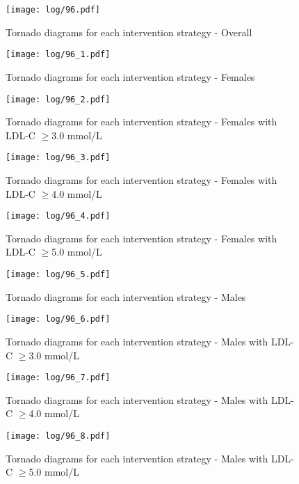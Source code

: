 \documentclass[11pt]{article}
\begin{document}
\color{Blue4}
\begin{stlog}\end{stlog}
\begin{stlog}\end{stlog}
\begin{stlog}\end{stlog}
\begin{figure}
    \centering
    \texttt{[image: log/96.pdf]}
    \caption{Tornado diagrams for each intervention strategy - Overall}
    \label{Tornado0}
\end{figure}
\begin{figure}
    \centering
    \texttt{[image: log/96\_1.pdf]}
    \caption{Tornado diagrams for each intervention strategy - Females}
    \label{Tornado00}
\end{figure}
\begin{figure}
    \centering
    \texttt{[image: log/96\_2.pdf]}
    \caption{Tornado diagrams for each intervention strategy - Females with LDL-C $\geq$3.0 mmol/L}
    \label{Tornado03}
\end{figure}
\begin{figure}
    \centering
    \texttt{[image: log/96\_3.pdf]}
    \caption{Tornado diagrams for each intervention strategy - Females with LDL-C $\geq$4.0 mmol/L}
    \label{Tornado04}
\end{figure}
\begin{figure}
    \centering
    \texttt{[image: log/96\_4.pdf]}
    \caption{Tornado diagrams for each intervention strategy - Females with LDL-C $\geq$5.0 mmol/L}
    \label{Tornado05}
\end{figure}
\begin{figure}
    \centering
    \texttt{[image: log/96\_5.pdf]}
    \caption{Tornado diagrams for each intervention strategy - Males}
    \label{Tornado10}
\end{figure}
\begin{figure}
    \centering
    \texttt{[image: log/96\_6.pdf]}
    \caption{Tornado diagrams for each intervention strategy - Males with LDL-C $\geq$3.0 mmol/L}
    \label{Tornado13}
\end{figure}
\begin{figure}
    \centering
    \texttt{[image: log/96\_7.pdf]}
    \caption{Tornado diagrams for each intervention strategy - Males with LDL-C $\geq$4.0 mmol/L}
    \label{Tornado14}
\end{figure}
\begin{figure}
    \centering
    \texttt{[image: log/96\_8.pdf]}
    \caption{Tornado diagrams for each intervention strategy - Males with LDL-C $\geq$5.0 mmol/L}
    \label{Tornado15}
\end{figure}
\begin{stlog}\end{stlog}
\color{black}
\end{document}
